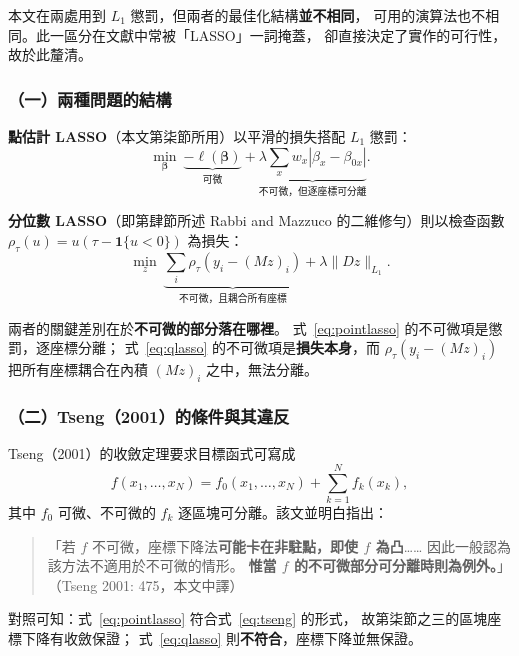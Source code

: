\documentclass[UTF8, fontset=macnew, a4paper, 12pt]{ctexart}
\begin{document}
本文在兩處用到 $L_1$ 懲罰，但兩者的最佳化結構\textbf{並不相同}，
可用的演算法也不相同。此一區分在文獻中常被「LASSO」一詞掩蓋，
卻直接決定了實作的可行性，故於此釐清。

\subsubsection{（一）兩種問題的結構}

\textbf{點估計 LASSO}（本文第柒節所用）以平滑的損失搭配 $L_1$ 懲罰：
\begin{equation}\label{eq:pointlasso}
\min_{\boldsymbol{\beta}}\ \underbrace{-\ell(\boldsymbol{\beta})}_{\text{可微}}
+\underbrace{\lambda\textstyle\sum_x w_x|\beta_x-\beta_{0x}|}_{\text{不可微，但逐座標可分離}} .
\end{equation}

\textbf{分位數 LASSO}（即第肆節所述 Rabbi and Mazzuco 的二維修勻）則以檢查函數
$\rho_\tau(u)=u(\tau-\mathbf{1}\{u<0\})$ 為損失：
\begin{equation}\label{eq:qlasso}
\min_{z}\ \underbrace{\textstyle\sum_i\rho_\tau(y_i-(Mz)_i)}_{\text{不可微，且耦合所有座標}}
+\lambda\|Dz\|_{L_1}.
\end{equation}

兩者的關鍵差別在於\textbf{不可微的部分落在哪裡}。
式~\eqref{eq:pointlasso} 的不可微項是懲罰，逐座標分離；
式~\eqref{eq:qlasso} 的不可微項是\textbf{損失本身}，而
$\rho_\tau(y_i-(Mz)_i)$ 把所有座標耦合在內積 $(Mz)_i$ 之中，無法分離。

\subsubsection{（二）Tseng（2001）的條件與其違反}

Tseng（2001）的收斂定理要求目標函式可寫成
\begin{equation}\label{eq:tseng}
f(x_1,\dots,x_N)=f_0(x_1,\dots,x_N)+\sum_{k=1}^{N} f_k(x_k),
\end{equation}
其中 $f_0$ 可微、不可微的 $f_k$ 逐區塊可分離。該文並明白指出：

\begin{quote}\small
「若 $f$ 不可微，座標下降法\textbf{可能卡在非駐點，即使 $f$ 為凸}……
因此一般認為該方法不適用於不可微的情形。
\textbf{惟當 $f$ 的不可微部分可分離時則為例外。}」
（Tseng 2001: 475，本文中譯）
\end{quote}

對照可知：式~\eqref{eq:pointlasso} 符合式~\eqref{eq:tseng} 的形式，
故第柒節之三的區塊座標下降有收斂保證；
式~\eqref{eq:qlasso} 則\textbf{不符合}，座標下降並無保證。
\end{document}
